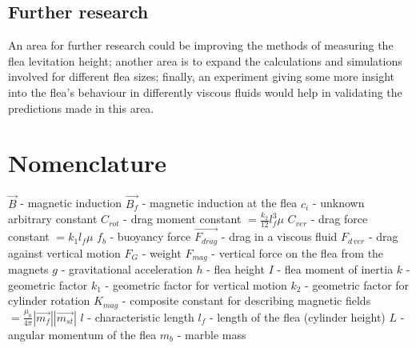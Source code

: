 \documentclass[10pt,a4paper]{article}
\begin{document}
\subsection{Further research}
An area for further research could be improving the methods of measuring the flea levitation height; another area is to expand the calculations and simulations involved for different flea sizes; finally, an experiment giving some more insight into the flea's behaviour in differently viscous fluids would help in validating the predictions made in this area.


\section{Nomenclature} 
$\vec{B}$ - magnetic induction \newline
$\vec{B_{f}}$ - magnetic induction at the flea \newline
$c_i$ - unknown arbitrary constant \newline
$C_{rot}$ - drag moment constant $ = \frac{k_2}{12}l_f^3 \mu $ \newline
$C_{ver}$ - drag force constant $ = k_1 l_{f} \mu $ \newline
$f_b$ - buoyancy force \newline
$\vec{F_{drag}}$ - drag in a viscous fluid \newline
$F_{d \, ver}$ - drag against vertical motion \newline
$F_G$ - weight \newline
$F_{mag}$ - vertical force on the flea from the magnets \newline
$g$ - gravitational acceleration \newline 
$h$ - flea height \newline
$I$ - flea moment of inertia \newline
$k$ - geometric factor \newline
$k_1$ - geometric factor for vertical motion \newline
$k_2$ - geometric factor for cylinder rotation \newline
$K_{mag}$ - composite constant for describing magnetic fields $= \frac{\mu_{0}}{4 \pi}{|\vec{m_f}||\vec{m_{st}}|}$\newline
$l$ - characteristic length \newline
$l_{f}$ - length of the flea (cylinder height) \newline
$L$ - angular momentum of the flea \newline
$m_b$ - marble mass \newline
\end{document}

